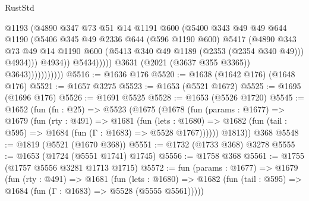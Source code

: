 \begin{lexlean}{RustStd}
\begin{coremodule}
                                      @1193
                                      (@4890
                                        @347
                                        @73
                                        @51
                                        @14
                                        @1191
                                        @600
                                        (@5400
                                          @343
                                          @49
                                          @49
                                          @644
                                          @1190
                                          (@5406
                                            @345
                                            @49
                                            @2336
                                            @644
                                            (@596 @1190 @600)
                                            @5417
                                            (@4890
                                              @343
                                              @73
                                              @49
                                              @14
                                              @1190
                                              @600
                                              (@5413 @340 @49 @1189 (@2353 (@2354 @340 @49)))
                                              @4934)))
                                        @4934))
                                    @5434)))))
                          @3631
                          (@2021 (@3637 @355 @3365))
                          @3643)))))))))))
@5516 := @1636 @176
@5520 := @1638 (@1642 @176) (@1648 @176)
@5521 := @1657 @3275
@5523 := @1653 (@5521 @1672)
@5525 := @1695 (@1696 @176)
@5526 := @1691 @5525
@5528 := @1653 (@5526 @1720)
@5545 := @1652
    (fun (fn : @25) =>
    @5523
      (@1675
        (@1678
          (fun (params : @1677) =>
          @1679
            (fun (rty : @491) =>
            @1681
              (fun (lets : @1680) =>
              @1682 (fun (tail : @595) => @1684 (fun (Γ : @1683) => @5528 @1767))))))
        @1813))
    @368
@5548 := @1819 (@5521 (@1670 @368))
@5551 := @1732 (@1733 @368) @3278
@5555 := @1653 (@1724 (@5551 @1741) @1745)
@5556 := @1758 @368
@5561 := @1755 (@1757 @5556 @3281 @1713 @1715)
@5572 := fun (params : @1677) =>
  @1679
    (fun (rty : @491) =>
    @1681
      (fun (lets : @1680) =>
      @1682 (fun (tail : @595) => @1684 (fun (Γ : @1683) => @5528 (@5555 @5561)))))

\end{coremodule}
\end{lexlean}
